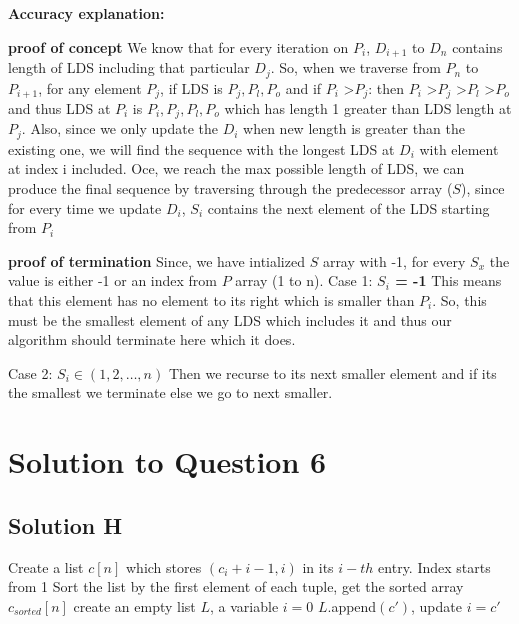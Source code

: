 \documentclass[11pt]{article}
\begin{document}
{\bf Accuracy explanation:} \newline

{\bf proof of concept}
We know that for every iteration on $P_i$, $D_{i+1}$ to $D_n$ contains length of LDS including that particular $D_j$. \newline
So, when we traverse from $P_n$ to $P_{i+1}$, for any element $P_j$, if LDS is $P_j, P_l, P_o$ and if $P_i$ \textgreater $P_j$: \newline
then $P_i$ \textgreater $P_j$ \textgreater $P_l$  \textgreater  $P_o$ \newline
and thus LDS at $P_i$ is $P_i, P_j, P_l, P_o$ which has length 1 greater than LDS length at $P_j$. \newline
Also, since we only update the $D_i$ when new length is greater than the existing one, we will find the sequence with
the longest LDS at $D_i$ with element at index i included. \newline
Oce, we reach the max possible length of LDS, we can produce the final sequence by traversing through the 
predecessor array ($S$), since for every time we update $D_i$, $S_i$ contains the next element of the LDS starting from $P_i$ \newline
 
{\bf proof of termination}
Since, we have intialized $S$ array with -1, for every $S_x$ the value is either -1 or an index from $P$ array (1 to n). \newline
Case 1: {\bf $S_i$ = -1} This means that this element has no element to its right which is smaller than $P_i$. 
So, this must be the smallest element of any LDS which includes it and  thus our algorithm should terminate here which it does.

Case 2: {\bf $S_i \in (1,2, \dots, n)$} Then we recurse to  its next smaller element and if its the smallest we terminate
else we go to next smaller.

\section{Solution to Question 6}

\subsection{Solution H}


\begin{algorithm}
\begin{algorithmic}
  \State Create a list $c[n]$ which stores $(c_i+i-1, i)$ in its $i-th$ entry. Index starts from 1
  \State Sort the list by the first element of each tuple, get the sorted array $c_{sorted}[n]$
  \State create an empty list $L$, a variable $i = 0$
      \State $L$.append$(c')$, update $i = c'$ 
    \EndIf
  \EndFor
\end{algorithmic}
\end{algorithm}
\end{document}
